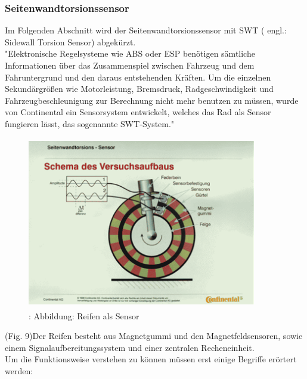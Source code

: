 	\subsubsection{Seitenwandtorsionssensor}
	Im Folgenden Abschnitt wird der Seitenwandtorsionssensor mit SWT ( engl.: Sidewall Torsion Sensor) abgekürzt.\\ 
	"Elektronische Regelsysteme wie ABS oder ESP benötigen sämtliche Informationen über das Zusammenspiel zwischen Fahrzeug und dem Fahruntergrund und den daraus entstehenden Kräften. Um die einzelnen Sekundärgrößen wie Motorleistung, Bremsdruck, Radgeschwindigkeit und Fahrzeugbeschleunigung zur Berechnung nicht mehr benutzen zu müssen, wurde von Continental ein Sensorsystem entwickelt, welches das Rad als Sensor fungieren lässt, das sogenannte SWT-System."
	
	\begin{figure}
		\centering
		\includegraphics[width=10cm, height=7.5cm] {swt1.png}
		\caption {\cite{TS_swt_pic}: Abbildung: Reifen als Sensor}
	\end{figure}
	
	(Fig. 9)Der Reifen besteht aus Magnetgummi und den Magnetfeldsensoren, sowie einem Signalaufbereitungssystem und einer zentralen Recheneinheit.\\
	Um die Funktionsweise verstehen zu können müssen erst einige Begriffe erörtert werden:
	

